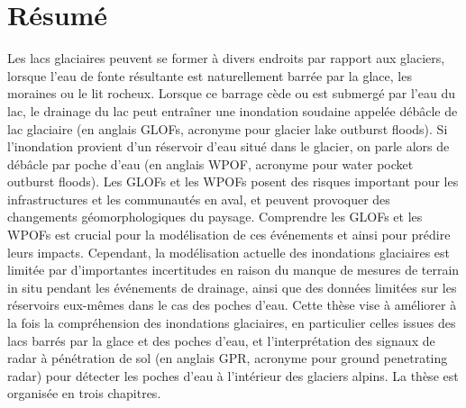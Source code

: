 \clearpage

\begingroup
\let\clearpage\relax
\let\cleardoublepage\relax
\let\cleardoublepage\relax

\chapter*{Résumé}

Les lacs glaciaires peuvent se former à divers endroits par rapport aux glaciers, lorsque l'eau de fonte résultante est naturellement barrée par la glace, les moraines ou le lit rocheux. Lorsque ce barrage cède ou est submergé par l'eau du lac, le drainage du lac peut entraîner une inondation soudaine appelée débâcle de lac glaciaire (en anglais GLOFs, acronyme pour glacier lake outburst floods). Si l'inondation provient d'un réservoir d'eau situé dans le glacier, on parle alors de débâcle par poche d'eau (en anglais WPOF, acronyme pour water pocket outburst floods). Les GLOFs et les WPOFs posent des risques important pour les infrastructures et les communautés en aval, et peuvent provoquer des changements géomorphologiques du paysage. Comprendre les GLOFs et les WPOFs est crucial pour la modélisation de ces événements et ainsi pour prédire leurs impacts. Cependant, la modélisation actuelle des inondations glaciaires est limitée par d'importantes incertitudes en raison du manque de mesures de terrain in situ pendant les événements de drainage, ainsi que des données limitées sur les réservoirs eux-mêmes dans le cas des poches d'eau. Cette thèse vise à améliorer à la fois la compréhension des inondations glaciaires, en particulier celles issues des lacs barrés par la glace et des poches d'eau, et l'interprétation des signaux de radar à pénétration de sol (en anglais GPR, acronyme pour ground penetrating radar) pour détecter les poches d'eau à l'intérieur des glaciers alpins. La thèse est organisée en trois chapitres.
%

